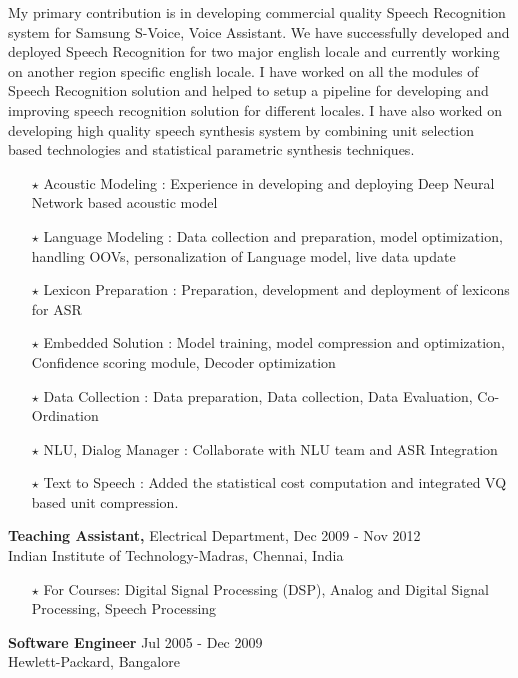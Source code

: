 \documentclass[line,margin]{res}
\begin{document}
\begin{resume}
My primary contribution is in developing commercial quality Speech Recognition system for Samsung S-Voice, Voice Assistant. We have successfully developed and deployed Speech Recognition for two major english locale and currently working on another region specific english locale. I have worked on all the modules of Speech Recognition solution and helped to setup a pipeline for developing and improving speech recognition solution for different locales. I have also worked on developing high quality speech synthesis system by combining unit selection based technologies and statistical parametric synthesis techniques.

\begin{itemize} \itemsep -1pt  %
\small
	\item[$\star$] Acoustic Modeling   : Experience in developing and deploying Deep Neural Network based acoustic model
	\item[$\star$] Language Modeling   : Data collection and preparation, model optimization, handling OOVs, personalization of Language model, live data update
	\item[$\star$] Lexicon Preparation : Preparation, development and deployment of lexicons for ASR
	\item[$\star$] Embedded Solution   : Model training, model compression and optimization, Confidence scoring module, Decoder optimization
	\item[$\star$] Data Collection 	   : Data preparation, Data collection, Data Evaluation, Co-Ordination
	\item[$\star$] NLU, Dialog Manager : Collaborate with NLU team and ASR Integration
	\item[$\star$] Text to Speech      : Added the statistical cost computation and integrated VQ based unit compression.
\end{itemize}

\normalsize
  {\bf Teaching Assistant,} Electrical Department, \hfill Dec 2009 - Nov 2012\\
 \hfill Indian Institute of Technology-Madras, Chennai, India
 
\begin{itemize} \itemsep -2pt  %
\small
	\item[$\star$] For Courses: Digital Signal Processing (DSP), Analog and Digital Signal Processing, Speech Processing
\end{itemize}

\normalsize
 {\bf Software Engineer} \hfill Jul 2005 - Dec 2009\\
 \hfill Hewlett-Packard, Bangalore


\end{resume}
\end{document}
